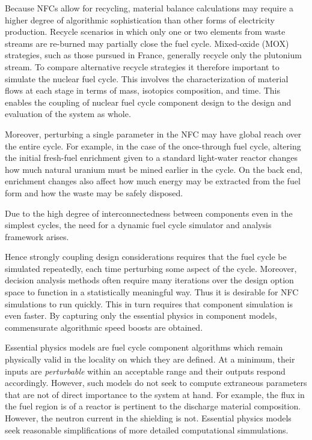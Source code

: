 Because NFCs allow for recycling, material balance calculations may require a higher degree of
algorithmic sophistication than other forms of electricity production.  
Recycle scenarios in which only one or two 
elements from waste streams are re-burned may partially close the fuel cycle.  
Mixed-oxide (MOX) strategies, such as those pursued in France, 
generally recycle only the plutonium stream.  
To compare alternative recycle strategies it therefore important to simulate the nuclear fuel cycle.  
This involves the characterization 
of material flows at each stage in terms of mass, isotopics composition, and time.  This enables 
the coupling of nuclear fuel cycle component design to the design and evaluation of the system as whole.  

Moreover, perturbing a single parameter in the NFC may have global reach over the entire cycle.
For example, in the case of the once-through fuel cycle, altering the initial fresh-fuel 
 enrichment given to a standard light-water reactor changes how much natural 
uranium must be mined earlier in the cycle.  On the back end, enrichment changes also affect 
how much energy may be extracted from the fuel form and how the waste may be safely disposed.

Due to the high degree of interconnectedness between components 
even in the simplest cycles, the need for a dynamic 
fuel cycle simulator and analysis framework arises.

Hence strongly coupling design considerations requires that the fuel cycle be simulated repeatedly, each 
time perturbing some aspect of the cycle.  
Moreover, decision analysis methods often require many iterations over the design option space
to function in a statistically meaningful way.
Thus it is desirable for
NFC simulations to run quickly.  This in turn requires that component simulation is even faster. 
By capturing only the essential physics in component models, commensurate algorithmic speed 
boosts are obtained.

Essential physics models are fuel cycle component algorithms which remain physically valid in the 
locality on which they are defined.  At a minimum, their inputs are \emph{perturbable} 
within an acceptable range and their outputs respond accordingly.  However, such 
models do not seek to compute extraneous parameters that are not of direct importance
to the system at hand.  For example, the flux in the fuel region is of a reactor is 
pertinent to the discharge material composition.  However, the neutron current in the 
shielding is not. 
Essential physics models seek reasonable simplifications of more detailed computational 
simmulations.

